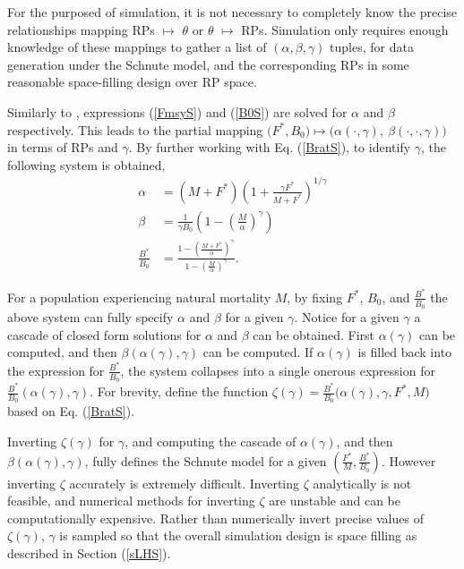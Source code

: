 %
For the purposed of simulation, it is not necessary to completely know 
the precise relationships mapping RPs $\mapsto$ $\theta$ or $\theta$ $\mapsto$ 
RPs. Simulation only requires enough knowledge of these mappings to gather a list 
of $(\alpha, \beta, \gamma)$ tuples, for data generation under the Schnute model, 
and the corresponding RPs in some reasonable space-filling design over RP space. 

%
Similarly to , expressions %
(\ref{FmsyS}) and (\ref{B0S}) are solved for $\alpha$ and $\beta$ respectively. 
This leads to the partial mapping 
$\big(F^*, B_0\big) \mapsto \big(\alpha(\cdot, \gamma), ~\beta(\cdot, \cdot, \gamma)\big)$ 
in terms of RPs and $\gamma$. 
By further working with Eq. (\ref{BratS}), to identify $\gamma$, the following 
system is obtained,
%
\begin{align}
\alpha &= (M+F^*)\left(1+\frac{\gamma F^*}{M+F^*}\right)^{1/\gamma} \nonumber\\
\beta &= \frac{1}{\gamma B_0}\left(1-\left(\frac{M}{\alpha}\right)^\gamma\right) \label{abgSys}\\
\frac{B^*}{B_0} &= \frac{1-\left(\frac{M+F^*}{\alpha}\right)^\gamma}{ 1-\left(\frac{M}{\alpha}\right)^\gamma } \nonumber.
\end{align}

%
For a population experiencing natural mortality $M$, by fixing $F^*$, 
$B_0$, and $\frac{B^*}{B_0}$ %
the above system can fully specify $\alpha$ and $\beta$ for a given $\gamma$. %
Notice for a given $\gamma$ a cascade of closed form solutions for $\alpha$ 
and $\beta$ can be obtained. First $\alpha(\gamma)$ can be computed, and then 
$\beta(\alpha(\gamma), \gamma)$ can be computed. If $\alpha(\gamma)$ is filled 
back into the expression for $\frac{B^*}{B_0}$, the system collapses into 
a single onerous expression for $\frac{B^*}{B_0}(\alpha(\gamma), \gamma)$. 
For brevity, define the function \mbox{$\zeta(\gamma)=\frac{B^*}{B_0}\big(\alpha(\gamma), \gamma, F^*, M\big)$} based on Eq. (\ref{BratS}). 

Inverting $\zeta(\gamma)$ for $\gamma$, and computing the cascade of 
$\alpha(\gamma)$, and then $\beta(\alpha(\gamma), \gamma)$, fully defines the 
Schnute model for a given $(\frac{F^*}{M}, \frac{B^*}{B_0})$. However
inverting $\zeta$ accurately is extremely difficult. Inverting $\zeta$ 
analytically is not feasible, and numerical methods for inverting 
$\zeta$ are unstable and can be computationally expensive. 
%
Rather than numerically invert precise values of $\zeta(\gamma)$, $\gamma$ is 
sampled so that the overall simulation design is space filling as described in 
Section (\ref{sLHS}).

